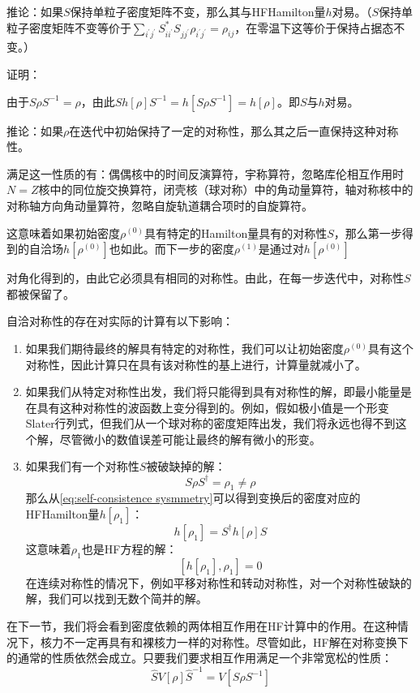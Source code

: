 \begin{booknote*}
推论：如果$S$保持单粒子密度矩阵不变，那么其与HFHamilton量$h$对易。（$S$保持单粒子密度矩阵不变等价于$\sum_{i^{\prime}j^{\prime}}S^{*}_{ii^{\prime}}S_{jj^{\prime}}\rho_{i^{\prime}j^{\prime}}=\rho_{ij}$，在零温下这等价于保持占据态不变。）

证明：

由于$S\rho S^{-1}=\rho$，由此$Sh[\rho]S^{-1}=h[S\rho S^{-1}]=h[\rho]$。即$S$与$h$对易。

推论：如果$\rho$在迭代中初始保持了一定的对称性，那么其之后一直保持这种对称性。

满足这一性质的有：偶偶核中的时间反演算符，宇称算符，忽略库伦相互作用时$N=Z$核中的同位旋交换算符，闭壳核（球对称）中的角动量算符，轴对称核中的对称轴方向角动量算符，忽略自旋轨道耦合项时的自旋算符。
\end{booknote*}
这意味着如果初始密度$\rho^{(0)}$具有特定的Hamilton量具有的对称性$S$，那么第一步得到的自洽场$h[\rho^{(0)}]$也如此。而下一步的密度$\rho^{(1)}$是通过对$h[\rho^{(0)}]$

对角化得到的，由此它必须具有相同的对称性。由此，在每一步迭代中，对称性$S$都被保留了。

自洽对称性的存在对实际的计算有以下影响\cite{Ri68}：
\begin{enumerate}
\item 如果我们期待最终的解具有特定的对称性，我们可以让初始密度$\rho^{(0)}$具有这个对称性，因此计算只在具有该对称性的基上进行，计算量就减小了。
\item 如果我们从特定对称性出发，我们将只能得到具有对称性的解，即最小能量是在具有这种对称性的波函数上变分得到的。例如，假如极小值是一个形变Slater行列式，但我们从一个球对称的密度矩阵出发，我们将永远也得不到这个解，尽管微小的数值误差可能让最终的解有微小的形变。
\item 如果我们有一个对称性$S$被破缺掉的解：
\[
S\rho S^{\dagger}=\rho_{1}\neq\rho
\]
那么从\ref{eq:self-consistence sysmmetry}可以得到变换后的密度对应的HFHamilton量$h[\rho_{1}]$：
\[
h[\rho_{1}]=S^{\dagger}h[\rho]S
\]
这意味着$\rho_{1}$也是HF方程的解：
\[
[h[\rho_{1}],\rho_{1}]=0
\]
在连续对称性的情况下，例如平移对称性和转动对称性，对一个对称性破缺的解，我们可以找到无数个简并的解。
\end{enumerate}
在下一节，我们将会看到密度依赖的两体相互作用在HF计算中的作用。在这种情况下，核力不一定再具有和裸核力一样的对称性。尽管如此，HF解在对称变换下的通常的性质依然会成立。只要我们要求相互作用满足一个非常宽松的性质：
\[
\hat{S}V[\rho]\hat{S}^{-1}=V[S\rho S^{-1}]
\]


